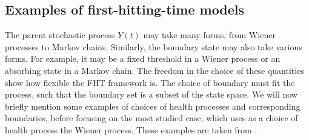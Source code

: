\subsection{Examples of first-hitting-time models}
The parent stochastic process $Y(t)$ may take many forms, from Wiener processes to Markov chains.
Similarly, the boundary state may also take various forms.
For example, it may be a fixed threshold in a Wiener process or an absorbing state in a Markov chain.
The freedom in the choice of these quantities show how flexible the FHT framework is.
The choice of boundary must fit the process, such that the boundary set is a subset of the state space.
We will now briefly mention some examples of choices of health processes and corresponding boundaries, before focusing on the most studied case, which uses as a choice of health process the Wiener process.
These examples are taken from \citet{leewhitmore2006}.
